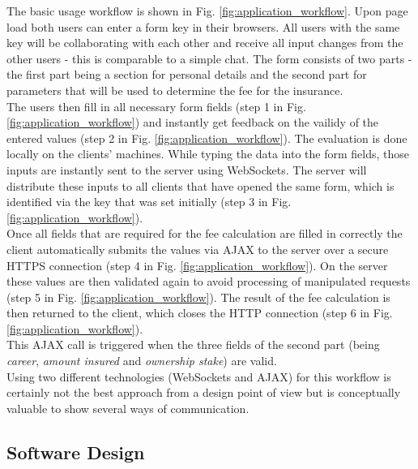 The basic usage workflow is shown in Fig. \ref{fig:application_workflow}.
Upon page load both users can enter a form key in their browsers. All users with the same key
will be collaborating with each other and receive all input changes from the
other users - this is comparable to a simple chat.
The form consists of two parts - the first part being a section for personal
details and the second part for parameters that will be used to determine the
fee for the insurance.\\
The users then fill in all necessary form fields (step 1 in Fig.
\ref{fig:application_workflow}) and instantly get feedback on the vailidy of the
entered values (step 2 in Fig. \ref{fig:application_workflow}).
The evaluation is done locally on the clients' machines.
While typing the data into the form fields, those inputs are instantly sent to
the server using WebSockets.
The server will distribute these inputs to all clients that have opened the same
form, which is identified via the key that was set initially (step 3 in Fig.
\ref{fig:application_workflow}).\\
Once all fields that are required for the fee calculation are filled in correctly
the client automatically submits the values via AJAX to the server over a secure
HTTPS connection (step 4 in Fig. \ref{fig:application_workflow}). On the server
these values are then validated again to avoid processing of manipulated requests
(step 5 in Fig. \ref{fig:application_workflow}). The result of the fee calculation
is then returned to the client, which closes the HTTP connection (step 6 in Fig. \ref{fig:application_workflow}).\\
This AJAX call is triggered when the three fields of the second part (being
\textit{career}, \textit{amount insured} and \textit{ownership stake}) are
valid.\\
Using two different technologies (WebSockets and AJAX) for this workflow is
certainly not the best approach from a design point of view but is conceptually
valuable to show several ways of communication.






\FloatBarrier
\subsection{Software Design}
\label{software_design}

